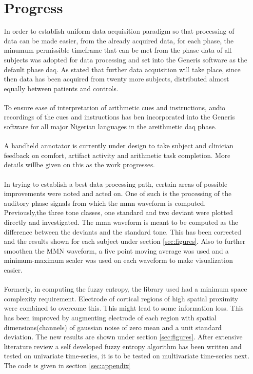 \documentclass[10pt]{article}
\begin{document}
\section{Progress}
In order to establish uniform data acquisition paradigm so that processing of data can be made 
easier, from the already acquired data, for each phase, the minumum permissible timeframe that can be met from 
the phase data of all subjects was adopted for data processing and set into the 
Generis software as the default phase \gls{daq}. As stated that further data acquisition will take place, 
since then data has been acquired from twenty more subjects, distributed almost equally between 
patients and controls.\\
\\
To ensure ease of interpretation of arithmetic cues and instructions, audio recordings of 
the cues and instructions has ben incorporated into the Generis software for all major Nigerian 
languages in the areithmetic \gls{daq} phase.\\
\\
A handheld annotator is currently under design to take subject and clinician feedback on comfort, 
artifact activity and arithmetic task completion. More details willbe given on this as the work progresses.\\
\\
In trying to establish a best data processing path, certain areas of possible improvements were 
noted and acted on. One of such is the processing of the auditory phase signals from which the \gls{mmn} 
waveform is computed. Previously,the three tone classes, one standard and two 
deviant were plotted directly and investigated. The \gls{mmn} waveform is meant to be computed as the difference between 
the deviants and the standard tone. This has been corrected and the results shown for each subject under section \ref{sec:figures}.
Also to further smoothen the MMN waveform, a five point moving average was used and a minimum-maximum 
scaler was used on each waveform to make visualization easier.\\
\\
Formerly, in computing the fuzzy entropy, the library used had a minimum space complexity requirement. 
Electrode of cortical regions of high spatial proximity were combined to overcome this. This might 
lead to some information loss. This has been improved by augmenting electrode of each region with spatial dimensions(channels) 
of gaussian noise of zero mean and a unit standard deviation. The new results are shown under 
section \ref{sec:figures}. After extensive  literature review a self developed fuzzy entropy algorithm has been written and tested 
on univariate time-series, it is to be tested on multivariate time-series next. The code is given in section 
\ref{sec:appendix}
\end{document}
